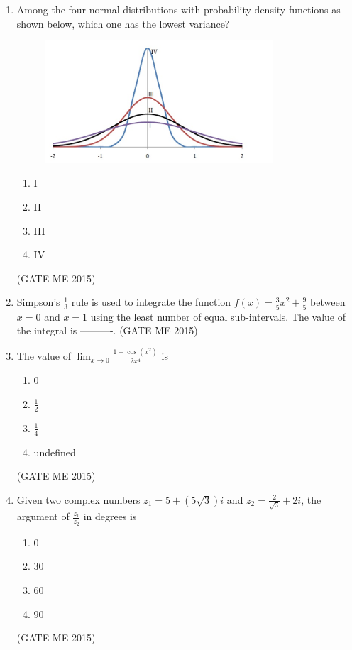 \documentclass[journal]{IEEEtran}
\begin{document}
\begin{enumerate}
\item Among the four normal distributions with probability density functions as shown below, which one has the lowest variance?

\begin{figure}[H]
    \centering
    \includegraphics[width=0.8\textwidth]{Fig 1.png}
    \caption{}
    \label{fig:question12}
\end{figure}

\begin{multicols}{4}
\begin{enumerate}
\item I  
\item II  
\item III  
\item IV  
\end{enumerate}
\end{multicols}
\hfill  (GATE ME 2015)

\item Simpson’s $\tfrac{1}{3}$ rule is used to integrate the function
$f(x)=\tfrac{3}{5}x^{2}+\tfrac{9}{5}$ between $x=0$ and $x=1$ using the
least number of equal sub-intervals. The value of the integral is ----------.
\hfill  (GATE ME 2015)

\item The value of $\displaystyle \lim_{x\to 0}\frac{1-\cos\!\left(x^{2}\right)}{2x^{4}}$ is
\begin{multicols}{2}
\begin{enumerate}
\item $0$
\item $\tfrac{1}{2}$
\item $\tfrac{1}{4}$
\item undefined
\end{enumerate}
\end{multicols}
\hfill  (GATE ME 2015)

\item Given two complex numbers $z_{1}=5+(5\sqrt{3})i$ and $z_{2}=\tfrac{2}{\sqrt{3}}+2i$,
the argument of $\tfrac{z_{1}}{z_{2}}$ in degrees is
\begin{multicols}{4}
\begin{enumerate}
\item $0$
\item $30$
\item $60$
\item $90$
\end{enumerate}
\end{multicols}
\hfill  (GATE ME 2015)


\end{enumerate}
\end{document}
